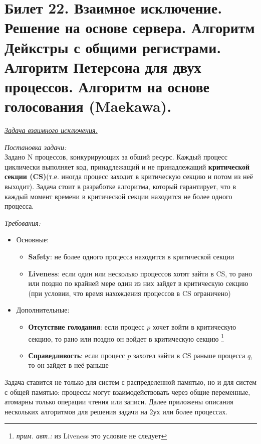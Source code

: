 \newpage
\section {Билет 22. Взаимное исключение. Решение на основе сервера. Алгоритм Дейкстры с общими регистрами. Алгоритм Петерсона для двух процессов. Алгоритм на основе голосования (Maekawa).}

\begin{center}
    \hypertarget{b_22_link}{\textit{\underline{Задача взаимного исключения.}}}
\end{center}

\textit{Постановка задачи:} \\
Задано N процессов, конкурирующих за общий ресурс. Каждый процесс циклически выполняет код, принадлежащий и не принадлежащий \textbf{критической секции (CS)}(т.е. иногда процесс заходит в критическую секцию и потом из неё выходит).
Задача стоит в разработке алгоритма, который гарантирует, что в каждый момент времени в критической секции находится не более одного процесса.

\textit{Требования:} 
\begin{itemize}
\item Основные:
\begin{itemize}
\item \textbf{Safety}: не более одного процесса находится в критической секции
\item \textbf{Liveness}: если один или несколько процессов хотят зайти в CS, то рано или поздно по крайней мере один из них зайдет в критическую секцию (при условии, что время нахождения процессов в CS ограничено)
\end{itemize}
\item Дополнительные:
\begin{itemize}
\item \textbf{Отсутствие голодания}: если процесс $p$ хочет войти в критическую секцию, то рано или поздно он войдет в критическую секцию \footnote{\textit{прим. авт.:} из Liveness это условие не следует} 
\item \textbf{Справедливость}: если процесс $p$ захотел зайти в CS раньше процесса $q$, то он зайдет в неё раньше
\end{itemize}
\end{itemize}

Задача ставится не только для систем с распределенной памятью, но и для систем с общей памятью: процессы могут взаимодействовать через общие переменные, атомарны только операции чтения или записи. Далее приложены описания нескольких алгоритмов для решения задачи на 2ух или более процессах. 


